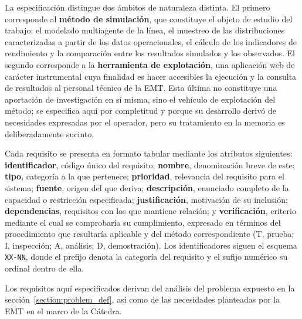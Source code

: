 La especificación distingue dos ámbitos de naturaleza distinta. El primero
corresponde al \textbf{método de simulación}, que constituye el objeto de
estudio del trabajo: el modelado multiagente de la línea, el muestreo de las
distribuciones caracterizadas a partir de los datos operacionales, el cálculo
de los indicadores de rendimiento y la comparación entre los resultados
simulados y los observados. El segundo corresponde a la \textbf{herramienta de
explotación}, una aplicación web de carácter instrumental cuya finalidad es
hacer accesibles la ejecución y la consulta de resultados al personal técnico
de la EMT. Esta última no constituye una aportación de investigación en sí
misma, sino el vehículo de explotación del método; se especifica aquí por
completitud y porque su desarrollo derivó de necesidades expresadas por el
operador, pero su tratamiento en la memoria es deliberadamente sucinto.

Cada requisito se presenta en formato tabular mediante los atributos
siguientes: \textbf{identificador}, código único del requisito;
\textbf{nombre}, denominación breve de este; \textbf{tipo}, categoría a la que
pertenece; \textbf{prioridad}, relevancia del requisito para el sistema;
\textbf{fuente}, origen del que deriva; \textbf{descripción}, enunciado
completo de la capacidad o restricción especificada; \textbf{justificación},
motivación de su inclusión; \textbf{dependencias}, requisitos con los que
mantiene relación; y \textbf{verificación}, criterio mediante el cual se
comprobaría su cumplimiento, expresado en términos del procedimiento que
resultaría aplicable y del método correspondiente (T, prueba; I, inspección;
A, análisis; D, demostración). Los identificadores siguen el esquema
\texttt{XX-NN}, donde el prefijo denota la categoría del requisito y el sufijo
numérico su ordinal dentro de ella.

Los requisitos aquí especificados derivan del análisis del problema expuesto en
la sección~\ref{section:problem_def}, así como de las necesidades planteadas
por la EMT en el marco de la Cátedra.

%

